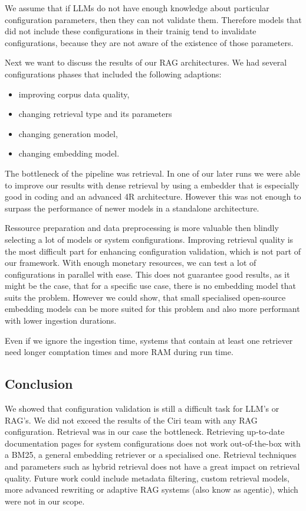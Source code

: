 We assume that if LLMs do not have enough knowledge about particular configuration parameters, then they can not validate them. Therefore models that did not include these configurations in their trainig tend to invalidate configurations, because they are not aware of the existence of those parameters.

Next we want to discuss the results of our RAG architectures. We had several configurations phases that included the following adaptions:
\begin{itemize}
    \item improving corpus data quality,
    \item changing retrieval type and its parameters
    \item changing generation model,
    \item changing embedding model.
\end{itemize}

The bottleneck of the pipeline was retrieval. In one of our later runs we were able to improve our results with dense retrieval by using a embedder that is especially good in coding and an advanced 4R architecture. However this was not enough to surpass the performance of newer models in a standalone architecture. 

Ressource preparation and data preprocessing is more valuable then blindly selecting a lot of models or system configurations. Improving retrieval quality is the most difficult part for enhancing configuration validation, which is not part of our framework. With enough monetary resources, we can test a lot of configurations in parallel with ease. This does not guarantee good results, as it might be the case, that for a specific use case, there is no embedding model that suits the problem. However we could show, that small specialised open-source embedding models can be more suited for this problem and also more performant with lower ingestion durations. 

Even if we ignore the ingestion time, systems that contain at least one retriever need longer comptation times and more RAM during run time. 

\subsection{Conclusion} \label{sec:exp_conclusion}

We showed that configuration validation is still a difficult task for LLM's or RAG's. We did not exceed the results of the Ciri team with any RAG configuration. Retrieval was in our case the bottleneck. Retrieving up-to-date documentation pages for system configurations does not work out-of-the-box with a BM25, a general embedding retriever or a specialised one. Retrieval techniques and parameters such as hybrid retrieval does not have a great impact on retrieval quality. Future work could include metadata filtering, custom retrieval models, more advanced rewriting or adaptive RAG systems (also know as agentic), which were not in our scope.

